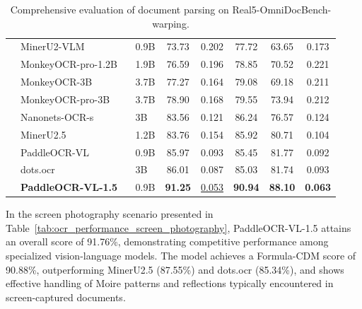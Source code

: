\documentclass[11pt, a4paper,logo,  copyright, nonumbering]{paddleocr}
\begin{document}
\begin{table}[H]
{\begin{tabular}{l|ll|c|c c c c}
         & MinerU2-VLM~\cite{MinerU2} & 0.9B & 73.73 & 0.202 & 77.72 & 63.65 & 0.173 \\
         & MonkeyOCR-pro-1.2B ~\cite{li2025monkeyocr}& 1.9B & 76.59 & 0.196 & 78.85 & 70.52 & 0.221 \\
         & MonkeyOCR-3B ~\cite{li2025monkeyocr}& 3.7B & 77.27 & 0.164 & 79.08 & 69.18 & 0.211 \\
         & MonkeyOCR-pro-3B ~\cite{li2025monkeyocr}& 3.7B & 78.90 & 0.168 & 79.55 & 73.94 & 0.212 \\
         & Nanonets-OCR-s~\cite{Nanonets-OCR-S} & 3B & 83.56 & 0.121 & 86.24 & 76.57 & 0.124 \\
         & MinerU2.5~\cite{niu2025mineru2} & 1.2B & 83.76 & 0.154 & 85.92 & 80.71 & 0.104 \\
         & PaddleOCR-VL ~\cite{cui2025paddleocrvl}& 0.9B & 85.97 & 0.093 & 85.45 & 81.77 & 0.092 \\ 
         & dots.ocr~\cite{dotsocr} & 3B & 86.01 & 0.087 & 85.03 & 81.74 & 0.093 \\
         & \textbf{PaddleOCR-VL-1.5} & 0.9B & \cellcolor{red!15}\textbf{91.25} & \cellcolor{cyan!15}\underline{0.053} & \cellcolor{red!15}\textbf{90.94} & \cellcolor{red!15}\textbf{88.10} & \cellcolor{red!15}\textbf{0.063} \\
        \bottomrule
    \end{tabular}%
    }
    \caption{Comprehensive evaluation of document parsing on Real5-OmniDocBench-warping.}
    \label{tab:ocr_performance_warping}
\end{table}


In the screen photography scenario presented in Table~\ref{tab:ocr_performance_screen_photography}, PaddleOCR-VL-1.5 attains an overall score of 91.76\%, demonstrating competitive performance among specialized vision-language models. The model achieves a Formula-CDM score of 90.88\%, outperforming MinerU2.5 (87.55\%) and dots.ocr (85.34\%), and shows effective handling of Moire patterns and reflections typically encountered in screen-captured documents.
\end{document}
